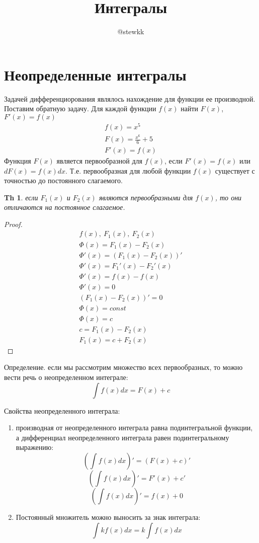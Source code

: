 \documentclass[12pt,a4paper]{article}
\title{Интегралы}
\author{@stewkk}
\newtheorem{theorem}{Th}
\begin{document}
\maketitle
\section{Неопределенные интегралы}
Задачей дифференциорования являлось нахождение для функции ее производной.
Поставим обратную задачу.
Для каждой функции $f(x)$ найти $F(x)$, $F'(x)=f(x)$
    \begin{gather*}
    f(x) = x^5\\
    F(x) = \frac{x^6}{6} + 5\\
    F'(x) = f(x)
    \end{gather*}
Функция $F(x)$ является первообразной для $f(x)$, если $F'(x)=f(x)$ или $dF(x)=f(x)dx$.
Т.е. первообразная для любой функции $f(x)$ существует с точностью до постоянного слагаемого.

\begin{theorem}
    если $F_1(x)$ и $F_2(x)$ являются первообразными для $f(x)$, то они отличаются на постоянное слагаемое.
\end{theorem}

\begin{proof}
\begin{gather*}
    f(x),\ F_1(x),\ F_2(x) \\
    \Phi(x) = F_1(x) - F_2(x) \\
    \Phi'(x) = (F_1(x) - F_2(x))' \\
    \Phi'(x) = F_1'(x) - F_2'(x) \\
    \Phi'(x) = f(x) - f(x) \\
    \Phi'(x) = 0 \\
    (F_1(x) - F_2(x))' = 0 \\
    \Phi(x) = const \\
    \Phi(x) = c \\
    c = F_1(x) - F_2(x) \\
    F_1(x) = c + F_2(x)
\end{gather*}
\end{proof}

Определение. если мы рассмотрим множество всех первообразных, то можно вести речь о неопределенном интеграле:
\[ \int f(x)dx = F(x) + c \]

Свойства неопределенного интеграла:
\begin{enumerate}
\item{производная от неопределенного интеграла равна подинтегральной функции, а дифференциал неопределенного интеграла равен подинтегральному выражению:
\[ (\int f(x)dx)' = (F(x) + c)' \]
\[ (\int f(x)dx)' = F'(x) + c' \]
\[ (\int f(x)dx)' = f(x) + 0 \]
}
\item{
Постоянный множитель можно выносить за знак интеграла:
\[ \int kf(x)dx = k \int f(x)dx \]
}

\end{enumerate}
\end{document}
